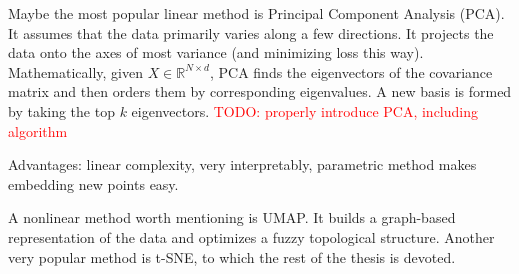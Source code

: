 Maybe the most popular linear method is Principal Component Analysis (PCA). It assumes that the data primarily varies along a few directions. It projects the data onto the axes of most variance (and minimizing loss this way). Mathematically, given $X \in \mathbb{R}^{N \times d}$, PCA finds the eigenvectors of the covariance matrix and then orders them by corresponding eigenvalues. A new basis is formed by taking the top $k$ eigenvectors. 
\textcolor{red}{TODO: properly introduce PCA, including algorithm}

Advantages: linear complexity, very interpretably, parametric method makes embedding new points easy. 

A nonlinear method worth mentioning is UMAP. It builds a graph-based representation of the data and optimizes a fuzzy topological structure. Another very popular method is t-SNE, to which the rest of the thesis is devoted. 
